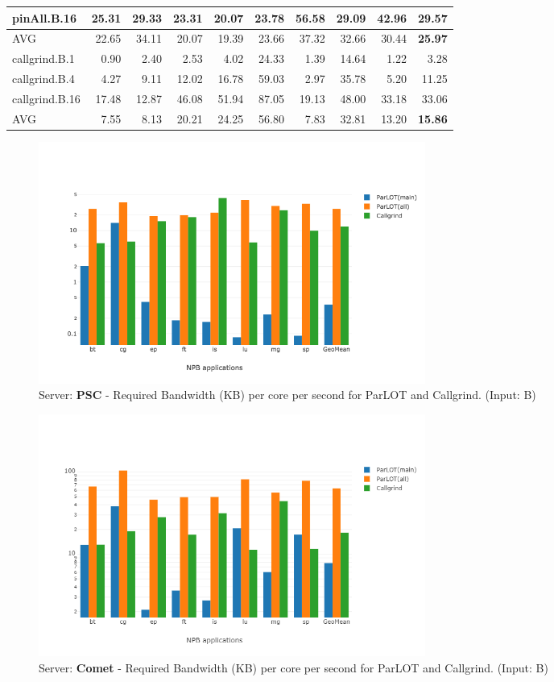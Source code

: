 \begin{table}[]
\begin{center}
\begin{tabular}{|l|rrrrrrrr|r|}
 pinAll.B.16    & 25.31 & 29.33 & 23.31 & 20.07 & 23.78 & 56.58 & 29.09 & 42.96 & 29.57 \\
 \hline
 AVG            & 22.65 & 34.11 & 20.07 & 19.39 & 23.66 & 37.32 & 32.66 & 30.44 & \textbf{25.97} \\
 \hline
 callgrind.B.1  &  0.90 &  2.40 &  2.53 &  4.02 & 24.33 &  1.39 & 14.64 &  1.22 &  3.28 \\
 callgrind.B.4  &  4.27 &  9.11 & 12.02 & 16.78 & 59.03 &  2.97 & 35.78 &  5.20 & 11.25 \\
 callgrind.B.16 & 17.48 & 12.87 & 46.08 & 51.94 & 87.05 & 19.13 & 48.00 & 33.18 & 33.06 \\
 \hline
 AVG            &  7.55 &  8.13 & 20.21 & 24.25 & 56.80 &  7.83 & 32.81 & 13.20 & \textbf{15.86} \\
\hline
\end{tabular}
\end{center}
\end{table}


\begin{figure}[!t]
\centering
\includegraphics[width=5in]{figs.psc/chartAvg_bw_B_p3_5.png}
\caption{ Server: \textbf{PSC} -  Required Bandwidth (KB) per core per second for ParLOT and Callgrind.  
(Input: B)}
\label{chartAvg_bw_B_p3_5}
\end{figure}


\begin{figure}[!t]
\centering
\includegraphics[width=5in]{figs.comet/comet_chartAvg_bw_B_p3_5.png}
\caption{ Server: \textbf{Comet} -  Required Bandwidth (KB) per core per second for ParLOT and Callgrind.  
(Input: B)}
\label{comet_chartAvg_bw_B_p3_5}
\end{figure}
